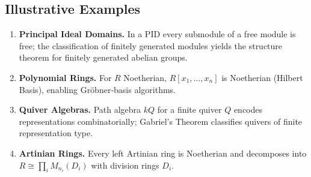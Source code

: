\subsection{Illustrative Examples}

\begin{enumerate}
    \item \textbf{Principal Ideal Domains.}
          In a PID every submodule of a free module is free;  
          the classification of finitely generated modules yields
          the structure theorem for finitely generated abelian groups.
    \item \textbf{Polynomial Rings.}
          For \(R\) Noetherian, \(R[x_1,\dots,x_n]\) is Noetherian
          (Hilbert Basis), enabling Gröbner‑basis algorithms.
    \item \textbf{Quiver Algebras.}
          Path algebra \(kQ\) for a finite quiver \(Q\) encodes
          representations combinatorially;  
          Gabriel’s Theorem classifies quivers of finite representation type.
    \item \textbf{Artinian Rings.}
          Every left Artinian ring is Noetherian and
          decomposes into
          \(R\cong\prod_i M_{n_i}(D_i)\) with division rings \(D_i\).
\end{enumerate}
